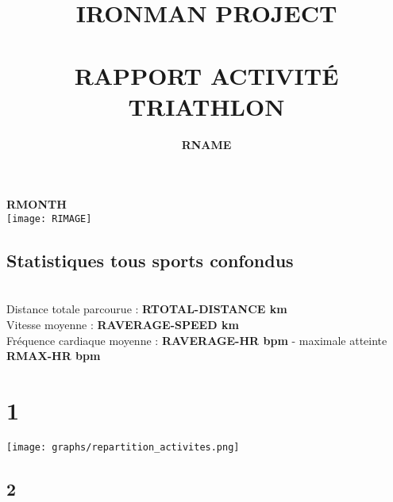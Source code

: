 \documentclass[a4paper,french,11pt]{report}
\title{	\normalsize \textsc{\uppercase{ironman project}}
		 	\\[1.2cm]
			\HRule{0.7pt} \\
			\vspace{0.5cm}
			\LARGE \textbf{\uppercase{rapport activité triathlon}}	%
			\HRule{1pt} \\
			\vspace{1.7cm}
		}
\author{
		\textbf{RNAME}\\
}
\makeatletter
\def\printtitle{%
    {\centering \@title\par}}
\def\printauthor{%
    {\centering \large \@author}}
\makeatother
\begin{document}

\thispagestyle{empty}		%

\printtitle					%
\printauthor				%
\vspace{1cm}

\begin{center}

\LARGE{\textbf{RMONTH}}\\
\vspace{4cm}
\texttt{[image: RIMAGE]}\\

\end{center}

\newpage




\section*{Statistiques tous sports confondus}


\\
\textbullet Distance totale parcourue : \textbf{RTOTAL-DISTANCE km} \\
\textbullet Vitesse moyenne : \textbf{RAVERAGE-SPEED km} \\
\textbullet Fréquence cardiaque moyenne : \textbf{RAVERAGE-HR bpm} - maximale atteinte \textbf{RMAX-HR bpm}\\
  


\chapter{1}
\texttt{[image: graphs/repartition\_activites.png]}
\section{2}

\end{document}
